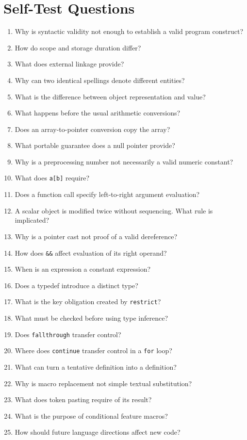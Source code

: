 \documentclass[10pt,letterpaper]{article}
\begin{document}
\section{Self-Test Questions}
\begin{enumerate}
  \item Why is syntactic validity not enough to establish a valid program construct?
  \item How do scope and storage duration differ?
  \item What does external linkage provide?
  \item Why can two identical spellings denote different entities?
  \item What is the difference between object representation and value?
  \item What happens before the usual arithmetic conversions?
  \item Does an array-to-pointer conversion copy the array?
  \item What portable guarantee does a null pointer provide?
  \item Why is a preprocessing number not necessarily a valid numeric constant?
  \item What does \texttt{a[b]} require?
  \item Does a function call specify left-to-right argument evaluation?
  \item A scalar object is modified twice without sequencing. What rule is implicated?
  \item Why is a pointer cast not proof of a valid dereference?
  \item How does \texttt{\&\&} affect evaluation of its right operand?
  \item When is an expression a constant expression?
  \item Does a typedef introduce a distinct type?
  \item What is the key obligation created by \texttt{restrict}?
  \item What must be checked before using type inference?
  \item Does \texttt{fallthrough} transfer control?
  \item Where does \texttt{continue} transfer control in a \texttt{for} loop?
  \item What can turn a tentative definition into a definition?
  \item Why is macro replacement not simple textual substitution?
  \item What does token pasting require of its result?
  \item What is the purpose of conditional feature macros?
  \item How should future language directions affect new code?
\end{enumerate}
\end{document}
